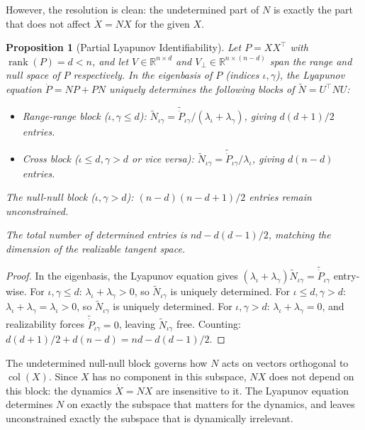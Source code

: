 \documentclass{article}
\newcommand{\RR}{\mathbb{R}}
\DeclareMathOperator{\col}{col}
\DeclareMathOperator{\rank}{rank}
\theoremstyle{plain}
\newtheorem{proposition}{Proposition}
\theoremstyle{definition}
\theoremstyle{remark}
\begin{document}
However, the resolution is clean: the undetermined part of $N$ is exactly the part that does not affect $\dot{X} = NX$ for the given $X$.

\begin{proposition}[Partial Lyapunov Identifiability]\label{prop:lyapunov-invert}
Let $P = XX^\top$ with $\rank(P) = d < n$, and let $V \in \RR^{n \times d}$ and $V_\perp \in \RR^{n \times (n-d)}$ span the range and null space of $P$ respectively.
In the eigenbasis of $P$ (indices $\iota, \gamma$), the Lyapunov equation $\dot{P} = NP + PN$ uniquely determines the following blocks of $\tilde{N} = U^\top N U$:

\begin{itemize}
\item \emph{Range-range block} ($\iota, \gamma \le d$): $\tilde{N}_{\iota\gamma} = \tilde{\dot{P}}_{\iota\gamma} / (\lambda_\iota + \lambda_\gamma)$, giving $d(d+1)/2$ entries.
\item \emph{Cross block} ($\iota \le d, \gamma > d$ or vice versa): $\tilde{N}_{\iota\gamma} = \tilde{\dot{P}}_{\iota\gamma} / \lambda_\iota$, giving $d(n - d)$ entries.
\end{itemize}

The \emph{null-null block} ($\iota, \gamma > d$): $(n-d)(n-d+1)/2$ entries remain unconstrained.

The total number of determined entries is $nd - d(d-1)/2$, matching the dimension of the realizable tangent space.
\end{proposition}

\begin{proof}
In the eigenbasis, the Lyapunov equation gives $(\lambda_\iota + \lambda_\gamma) \tilde{N}_{\iota\gamma} = \tilde{\dot{P}}_{\iota\gamma}$ entry-wise.
For $\iota, \gamma \le d$: $\lambda_\iota + \lambda_\gamma > 0$, so $\tilde{N}_{\iota\gamma}$ is uniquely determined.
For $\iota \le d, \gamma > d$: $\lambda_\iota + \lambda_\gamma = \lambda_\iota > 0$, so $\tilde{N}_{\iota\gamma}$ is uniquely determined.
For $\iota, \gamma > d$: $\lambda_\iota + \lambda_\gamma = 0$, and realizability forces $\tilde{\dot{P}}_{\iota\gamma} = 0$, leaving $\tilde{N}_{\iota\gamma}$ free.
Counting: $d(d+1)/2 + d(n-d) = nd - d(d-1)/2$.
\end{proof}

The undetermined null-null block governs how $N$ acts on vectors orthogonal to $\col(X)$.
Since $X$ has no component in this subspace, $NX$ does not depend on this block: the dynamics $\dot{X} = NX$ are insensitive to it.
The Lyapunov equation determines $N$ on exactly the subspace that matters for the dynamics, and leaves unconstrained exactly the subspace that is dynamically irrelevant.
\end{document}
